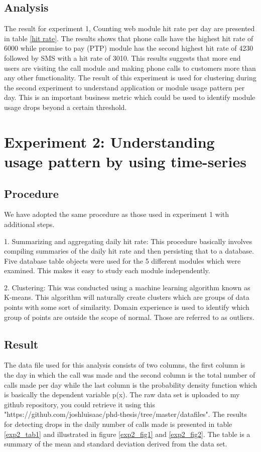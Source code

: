 \documentclass[12pt, letterpaper, titlepage]{report}
\begin{document}
\subsection{Analysis}

The result for experiment 1, Counting web module hit rate per day are presented in table \ref{hit rate}. The results shows that phone calls have the highest hit rate of 6000 while promise to pay (PTP) module has the second highest hit rate of 4230 followed by SMS with a hit rate of 3010. This results suggests that more end users are visiting the call module and making phone calls to customers more than any other functionality. The result of this experiment is used for clustering during the second experiment to understand application or module usage pattern per day. This is an important business metric which could be used to identify module usage drops beyond a certain threshold.

\section{Experiment 2: Understanding usage pattern by using time-series}

\subsection{Procedure}
We have adopted the same procedure as those used in experiment 1 with additional steps.

1. Summarizing and aggregating daily hit rate: This procedure basically involves compiling summaries of the daily hit rate and then persisting that to a database. Five database table objects were used  for the 5 different modules which were examined. This makes it easy to study each module independently. 

2. Clustering: This was conducted using a machine learning algorithm known as K-means. This algorithm will naturally create clusters which are groups of data points with some sort of similarity. Domain experience is used to identify which group of points are outside the scope of normal. Those are referred to as outliers.

\subsection{Result} 
The data file used for this analysis consists of two columns, the first column is the day in which the call was made and the second column is the total number of calls made per day while the last column is the probability density function which is basically the dependent variable p(x). 
The raw data set is uploaded to my github repository, you could retrieve it using this "https://github.com/joshluisaac/phd-thesis/tree/master/datafiles".
The results for detecting drops in the daily number of calls made is presented in table \ref{exp2_tab1}  and illustrated in figure \ref{exp2_fig1} and \ref{exp2_fig2}. The table is a summary of the mean and standard deviation derived from the data set.
\end{document}
